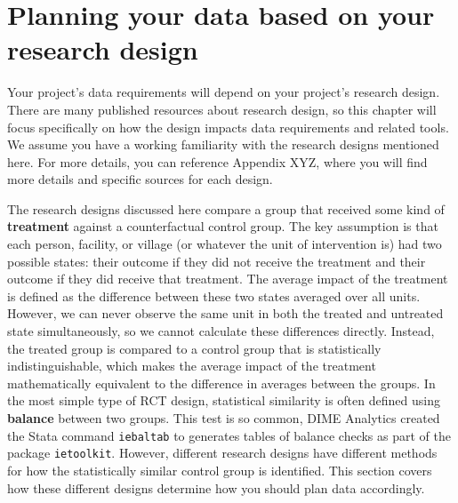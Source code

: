 


\section{Planning your data based on your research design}

Your project's data requirements will depend on your project's research design.
There are many published resources about research design,
so this chapter will focus specifically on how the design impacts data requirements
and related tools.
We assume you have a working familiarity
with the research designs mentioned here.
For more details, you can reference Appendix XYZ,
where you will find more details and specific sources for each design.

The research designs discussed here compare a group that received
some kind of \textbf{treatment}
against a counterfactual control group.
The key assumption is that each
person, facility, or village (or whatever the unit of intervention is)
had two possible states: their outcome if they did not receive the treatment
and their outcome if they did receive that treatment.
The average impact of the treatment is defined as
the difference between these two states averaged over all units.
However, we can never observe the same unit
in both the treated and untreated state simultaneously,
so we cannot calculate these differences directly.
Instead, the treated group is compared to a control group
that is statistically indistinguishable,
which makes the average impact of the treatment
mathematically equivalent to the difference in averages between the groups.
In the most simple type of RCT design,
statistical similarity is often defined using \textbf{balance} between two groups.
This test is so common,
DIME Analytics created the Stata command \texttt{iebaltab}
to generates tables of balance checks
as part of the package \texttt{ietoolkit}.
However, different research designs have different methods
for how the statistically similar control group is identified.
This section covers how these different designs
determine how you should plan data accordingly.

